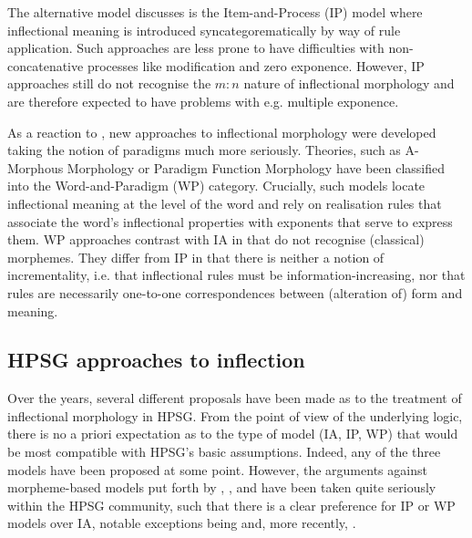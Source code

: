 \documentclass[output=paper
                ,modfonts
                ,nonflat
	        ,collection
	        ,collectionchapter
	        ,collectiontoclongg
 	        ,biblatex
                ,babelshorthands
                ,newtxmath
                ,draftmode
                ,colorlinks, citecolor=brown
] {langscibook}
\begin{document}
{The alternative model \citet{Hockett54} discusses is the
Item-and-Process (IP) model where inflectional meaning is introduced
syncategorematically by way of rule application. Such approaches
are less prone to have difficulties with non-concatenative processes
like modification and zero exponence. However, IP approaches still do
not recognise the $m:n$ nature of inflectional morphology and are
therefore expected to have problems with e.g. multiple exponence. 


As a reaction to \citet{Matthews72}, new approaches to inflectional
morphology were developed taking the notion of paradigms much more
seriously. Theories, such as A-Morphous Morphology \citep{Anderson92}
or Paradigm Function Morphology \citep{Stump01} have been classified
into the Word-and-Paradigm (WP) category. Crucially, such models
locate inflectional meaning at the level of the word and rely on
realisation rules that associate the word's inflectional properties
with exponents that serve to express them. WP approaches contrast with
IA in that do not recognise (classical) morphemes. They differ
from IP in that there is neither a  notion of incrementality,
i.e. that inflectional rules must be information-increasing, nor that
rules are necessarily one-to-one correspondences between (alteration
of) form and meaning. 


\subsection{HPSG approaches to inflection}
\label{sec:InflHPSG}

Over the years, several different proposals have been made as to the
treatment of inflectional morphology in HPSG. From the point of view
of the underlying logic, there is no a priori expectation as to the type of model
(IA, IP, WP) that would be most compatible with HPSG's basic
assumptions. Indeed, any of the three models have been proposed at
some point. However, the arguments against morpheme-based models put
forth by \citet{Matthews72}, \citet{Spencer91}, \citet{Anderson92} and
\citet{Stump01} have been taken quite seriously within the HPSG
community, such that there is a clear preference for IP or WP models over
IA, notable exceptions being \citet{van-eynde_f94} and, more
recently, \citet{Emerson15}.

}
\end{document}
